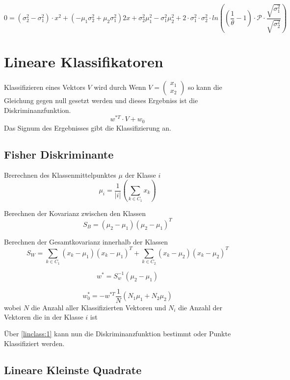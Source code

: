 \documentclass{article}
\begin{document}
$$ 0 = (\sigma_{2}^2 - \sigma_{1}^2) \cdot x^2 +
(-\mu_{1}\sigma_{2}^2 + \mu_{2} \sigma_{1}^2)2x 
+ \sigma_{2}^2 \mu_{1}^2 - \sigma_{1}^2\mu_{2}^2 
+ 2 \cdot \sigma_{1}^2 
\cdot \sigma_{2}^2 
\cdot ln((\frac{1}{\theta} - 1) 
\cdot \mathcal{P} 
\cdot \frac{\sqrt{\sigma^{2}_1}}{\sqrt{ \sigma^{2}_2}}) 
$$



\section{Lineare Klassifikatoren}

Klassifizieren eines Vektors $V$ wird durch Wenn $V=\begin{pmatrix}
x_1 \\ x_2
\end{pmatrix}$ so kann die Gleichung gegen null gesetzt werden und dieses Ergebniss ist die Diskriminanzfunktion.
\begin{equation} \label{linclass:1}
	w^{*T} \cdot V + w_0
\end{equation}
Das Signum des Ergebnisses gibt die Klassifizierung an.

\subsection{Fisher Diskriminante}

Brerechnen des Klassenmittelpunktes $\mu$ der Klasse $i$
$$\mu_i = \frac{1}{|i|} (\sum_{k \in C_1}^{} x_k)$$

Berechnen der Kovarianz zwischen den Klassen 
$$
S_{B} = (\mu_{2} - \mu_{1})(\mu_{2} - \mu_{1})^T
$$

Berechnen der Gesamtkovarianz innerhalb der Klassen
$$ S_{W} = \sum_{k \in C_1}^{}  (x_k - \mu_{1})(x_k - \mu_{1})^T +
\sum_{k \in C_2}^{}  (x_k - \mu_{2})(x_k - \mu_{2})^T
 $$
 


$$w^* = S_{w}^{-1}(\mu_{2} - \mu_{1}) $$

$$ w_{0}^* = - w^{*T} \frac{1}{N} (N_{1} \mu_{1} + N_2 \mu_{2}) $$
wobei $N$ die Anzahl aller Klassifizierten Vektoren und $N_i$ die Anzahl der Vektoren die in der Klasse $i$ ist

Über \ref{linclass:1} kann nun die Diskriminanzfunktion bestimmt oder Punkte Klassifiziert werden.

\subsection{Lineare Kleinste Quadrate}
\end{document}

